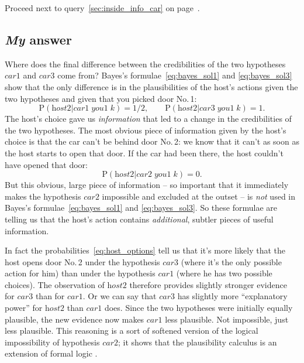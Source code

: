 \documentclass[\ifafour a4paper,12pt,\else a5paper,10pt,\fi%
onecolumn,oneside,article,%
british%
]{memoir}
\theoremstyle{remark}
\theoremstyle{innote}
\newcommand*{\citep}{\parencites}
\newcommand{\addsubsec}[1]{\subsection*{#1}\addcontentsline{toc}{subsection}{#1}}
\newcommand*{\p}{\mathrm{P}}%
\renewcommand*{\|}{\nonscript\,\vert\nonscript\;\mathopen{}}
\newcommand*{\cara}{\textit{car1}}
\newcommand*{\carb}{\textit{car2}}
\newcommand*{\carc}{\textit{car3}}
\newcommand*{\hostb}{\textit{host2}}
\newcommand*{\youa}{\textit{you1}}
\begin{document}
Proceed next to query~\ref{sec:inside_info_car} on
page~\pageref{sec:inside_info_car}.



\clearpage

\addsubsec{\emph{My} answer}


Where does the final difference between the credibilities of the two
hypotheses $\cara$ and $\carc$ come from? Bayes's
formulae~\eqref{eq:bayes_sol1} and \eqref{eq:bayes_sol3} show that the only
difference is in the plausibilities of the host's actions given the two
hypotheses and given that you picked door No.\,1:
\begin{equation}
  \label{eq:host_options}
      \p(\hostb|\cara\;\youa\;k) = 1/2,\qquad
    \p(\hostb|\carc\;\youa\;k) = 1.
\end{equation}
The host's choice gave us \emph{information} that led to a change in the
credibilities of the two hypotheses. The most obvious piece of information
given by the host's choice is that the car can't be behind door No.\,2: we
know that it can't as soon as the host starts to open that door. If the car
had been there, the host couldn't have opened that door:
\begin{equation}
  \label{eq:host_no_2}
  \p(\hostb|\carb\;\youa\;k) = 0.
\end{equation}
But this obvious, large piece of information -- so important that it
immediately makes the hypothesis $\carb$ impossible and excluded at the
outset -- is \emph{not} used in Bayes's formulae~\eqref{eq:bayes_sol1} and
\eqref{eq:bayes_sol3}. So these formulae are telling us that the host's
action contains \emph{additional}, subtler pieces of useful information.

In fact the probabilities~\eqref{eq:host_options} tell us that it's more
likely that the host opens door No.\,2 under the hypothesis $\carc$ (where
it's the only possible action for him) than under the hypothesis $\cara$
(where he has two possible choices). The observation of $\hostb$ therefore
provides slightly stronger evidence for $\carc$ than for $\cara$. Or we can
say that $\carc$ has slightly more \enquote{explanatory power} for $\hostb$ than
$\cara$ does. Since the two hypotheses were initially equally plausible,
the new evidence now makes $\cara$ less plausible. Not impossible, just
less plausible. This reasoning is a sort of softened version of the logical
impossibility of hypothesis $\carb$; it shows that the plausibility
calculus is an extension of formal logic \citep[take a look
at][]{hailperin1984,hailperin1991,hailperin1996}.
\end{document}
